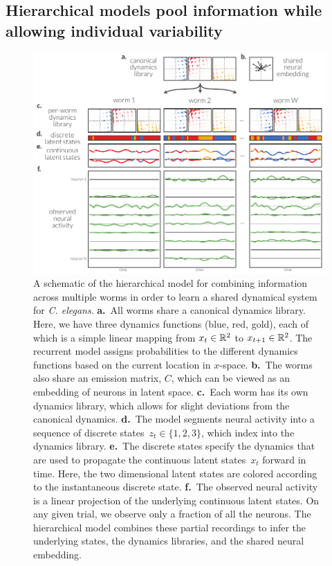 \documentclass{article}
\newcommand{\celegans}{\textit{C. elegans}}
\begin{document}
\subsection*{Hierarchical models pool information while allowing individual variability}

\begin{figure}[t]
\centering%
\includegraphics[width=6in]{figures/figure1} 
\caption{A schematic of the hierarchical model for combining
  information across multiple worms in order to learn a shared
  dynamical system for \celegans.  \textbf{a.}~All worms share a
  canonical dynamics library. Here, we have three dynamics functions
  (blue, red, gold), each of which is a simple linear mapping from
  $x_t \in \mathbb{R}^2$ to $x_{t+1} \in \mathbb{R}^2$.  The recurrent model
  assigns probabilities to the different dynamics functions based on
  the current location in $x$-space.  \textbf{b.}~The worms also share
  an emission matrix, $C$, which can be viewed as an embedding of
  neurons in latent space.  \textbf{c.}~Each worm has its own dynamics
  library, which allows for slight deviations from the canonical
  dynamics.  \textbf{d.}~The model segments neural activity into a
  sequence of discrete states~$z_{t} \in \{1, 2, 3\}$, which index
  into the dynamics library.  \textbf{e.}~The discrete states specify
  the dynamics that are used to propagate the continuous latent
  states~$x_t$ forward in time. Here, the two dimensional latent
  states are colored according to the instantaneous discrete
  state. \textbf{f.}~The observed neural activity is a linear
  projection of the underlying continuous latent states.  On any given
  trial, we observe only a fraction of all the neurons.  The
  hierarchical model combines these partial recordings to infer the
  underlying states, the dynamics libraries, and the shared neural
  embedding. }
\label{fig:model}
\end{figure}
\end{document}
